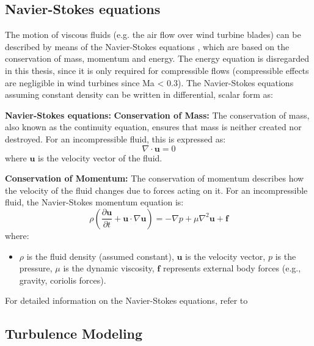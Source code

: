 \subsection{Navier-Stokes equations}
The motion of viscous fluids (e.g. the air flow over wind turbine blades) can be described by
means of the Navier-Stokes equations \cite{NSeqn}, which are based on the conservation of mass, momentum
and energy. The energy equation is disregarded in this thesis, since it is only required for
compressible flows (compressible effects are negligible in wind turbines since Ma < 0.3). The
Navier-Stokes equations assuming constant density can be written in differential, scalar form
as:
\begin{tcolorbox}[colback=blue!5!white, colframe=blue!75!black]
    \textbf{Navier-Stokes equations:}
    \newline
    \textbf{Conservation of Mass:}
    The conservation of mass, also known as the continuity equation, ensures that mass is neither
    created nor destroyed. For an incompressible fluid, this is expressed as:
    \begin{equation}
    \nabla \cdot \mathbf{u} = 0
    \end{equation}
    where $\mathbf{u}$ is the velocity vector of the fluid.
    
    \textbf{Conservation of Momentum:}
    The conservation of momentum describes how the velocity of the fluid changes due to forces acting on it. For an incompressible fluid, the Navier-Stokes momentum equation is:
    \begin{equation}
    \rho \left( \frac{\partial \mathbf{u}}{\partial t} + \mathbf{u} \cdot \nabla \mathbf{u} \right) = -\nabla p + \mu \nabla^2 \mathbf{u} + \mathbf{f}
    \end{equation}
    where:
    \begin{itemize}
        \item $\rho$ is the fluid density (assumed constant), $\mathbf{u}$ is the velocity vector, $p$ is the pressure, $\mu$ is the dynamic viscosity, $\mathbf{f}$ represents external body forces (e.g., gravity, coriolis forces).
    \end{itemize}
    For detailed information on the Navier-Stokes equations, refer to \cite{NSeqn}
\end{tcolorbox}



\subsection{Turbulence Modeling}

